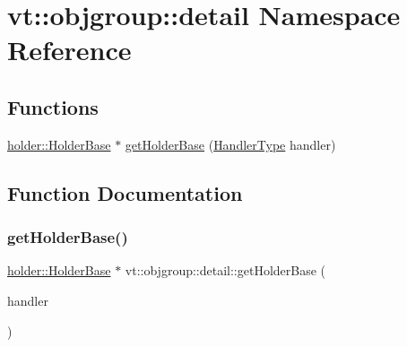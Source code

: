 \hypertarget{namespacevt_1_1objgroup_1_1detail}{}\section{vt\+:\+:objgroup\+:\+:detail Namespace Reference}
\label{namespacevt_1_1objgroup_1_1detail}
\subsection*{Functions}
\begin{DoxyCompactItemize}
\item 
\hyperlink{structvt_1_1objgroup_1_1holder_1_1_holder_base}{holder\+::\+Holder\+Base} $\ast$ \hyperlink{namespacevt_1_1objgroup_1_1detail_a8f4e9c94566b84be869adfeca53fc784}{get\+Holder\+Base} (\hyperlink{namespacevt_af64846b57dfcaf104da3ef6967917573}{Handler\+Type} handler)
\end{DoxyCompactItemize}


\subsection{Function Documentation}
\mbox{\label{namespacevt_1_1objgroup_1_1detail_a8f4e9c94566b84be869adfeca53fc784}} 
\subsubsection{\texorpdfstring{get\+Holder\+Base()}{getHolderBase()}}
{\footnotesize\ttfamily \hyperlink{structvt_1_1objgroup_1_1holder_1_1_holder_base}{holder\+::\+Holder\+Base} $\ast$ vt\+::objgroup\+::detail\+::get\+Holder\+Base (\begin{DoxyParamCaption}\item[{\hyperlink{namespacevt_af64846b57dfcaf104da3ef6967917573}{Handler\+Type}}]{handler }\end{DoxyParamCaption})}

